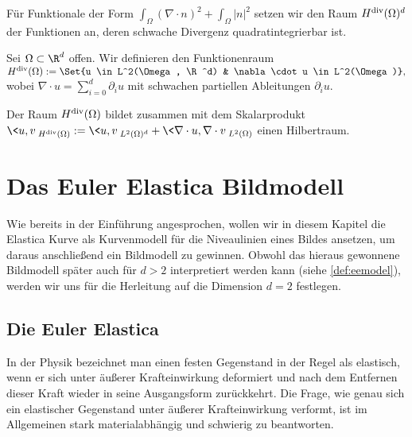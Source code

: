 \documentclass{mythesis}
\begin{document}
Für Funktionale der Form $\int_\Omega (\nabla \cdot n)^2 + \int_\Omega |n|^2$ setzen wir den Raum $H^{\mathrm{div}}(\Omega)^d$ der Funktionen an, deren schwache Divergenz quadratintegrierbar ist.

\begin{definition} \label{def:hdiv}
    Sei $\Omega \subset \R^d$ offen.
    Wir definieren den Funktionenraum
    \begin{math}
	\Hdiv(\Omega) := \Set{u \in L^2(\Omega, \R^d) & \nabla \cdot u \in L^2(\Omega)},
    \end{math}
    wobei $\nabla \cdot u = \sum_{i=0}^d \partial_i u$ mit schwachen partiellen Ableitungen $\partial_i u$.
\end{definition}

\begin{proposition} \label{lem:hdivhilbert}
    Der Raum $H^{\mathrm{div}}(\Omega)$ bildet zusammen mit dem Skalarprodukt
    \begin{math}
	\<u, v\>_{\Hdiv(\Omega)} := \<u, v\>_{L^2(\Omega)^d} + \<\nabla \cdot u, \nabla \cdot v\>_{L^2(\Omega)}
    \end{math}
    einen Hilbertraum.
\end{proposition}








\chapter{Das Euler Elastica Bildmodell} \label{chap:image_model}


Wie bereits in der Einführung angesprochen, wollen wir in diesem Kapitel die Elastica Kurve als Kurvenmodell für die Niveaulinien eines Bildes ansetzen, um daraus anschließend ein Bildmodell zu gewinnen.
Obwohl das hieraus gewonnene Bildmodell später auch für $d > 2$ interpretiert werden kann (siehe \ref{def:eemodel}), werden wir uns für die Herleitung auf die Dimension $d = 2$ festlegen.

\section{Die Euler Elastica}

In der Physik bezeichnet man einen festen Gegenstand in der Regel als elastisch, wenn er sich unter äußerer Krafteinwirkung deformiert und nach dem Entfernen dieser Kraft wieder in seine Ausgangsform zurückkehrt.
Die Frage, wie genau sich ein elastischer Gegenstand unter äußerer Krafteinwirkung verformt, ist im Allgemeinen stark materialabhängig und schwierig zu beantworten.
\end{document}
